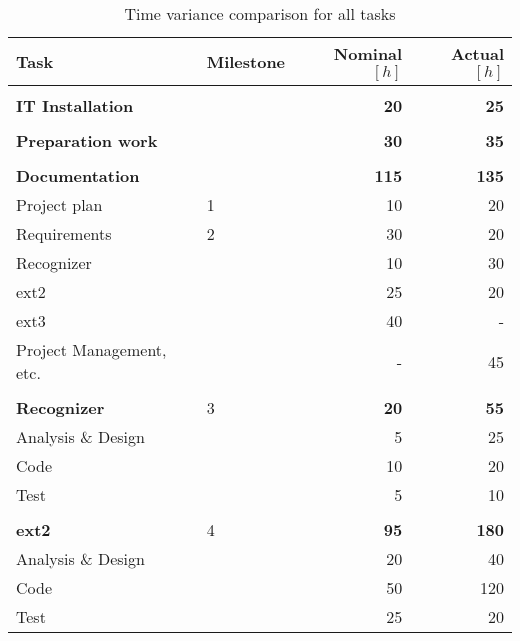 \begin{longtable}{p{5cm}p{2cm}rr}
\caption[Time variance comparison]{\label{pic:varianceComp}Time variance comparison for all tasks}\\

\textbf{Task}										& \textbf{Milestone}		& \textbf{Nominal $[h]$}		& \textbf{Actual $[h]$}\\
\hline

& & &\\
\textbf{IT Installation}				&												&	\textbf{20}								& \textbf{25}\\						

& & &\\
\textbf{Preparation work}				&												&	\textbf{30}								& \textbf{35}\\

& & &\\
\textbf{Documentation}					&						 						& \textbf{115}							& \textbf{135}\\
Project plan 										& 1											& 10												& 20\\
Requirements 										& 2											& 30												& 20\\
Recognizer											&												& 10												& 30\\
ext2														&												& 25												& 20\\
ext3														&												& 40												& -\\
Project Management, etc.        &                       & -                         & 45\\

&&&\\
\textbf{Recognizer}							& 3											& \textbf{20}							  & \textbf{55}\\
Analysis \& Design							&												& 5													& 25\\
Code														&												&	10												& 20\\
Test														&												&	5													& 10\\

&&&\\
\textbf{ext2}										& 4											&	\textbf{95}								& \textbf{180}\\
Analysis \& Design							&												& 20												& 40\\
Code														&												&	50												& 120\\
Test														&												&	25												& 20\\


\end{longtable}
